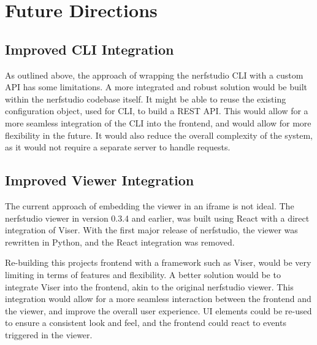 \section{Future Directions}
\label{sec:system:future}

\subsection*{Improved CLI Integration}

As outlined above, the approach of wrapping the nerfstudio CLI with a custom API has some limitations.
A more integrated and robust solution would be built within the nerfstudio codebase itself.
It might be able to reuse the existing configuration object, used for CLI, to build a REST API.
This would allow for a more seamless integration of the CLI into the frontend, and would allow for more flexibility in the future.
It would also reduce the overall complexity of the system, as it would not require a separate server to handle requests.

\subsection*{Improved Viewer Integration}

The current approach of embedding the viewer in an iframe is not ideal.
The nerfstudio viewer in version 0.3.4 and earlier, was built using React with a direct integration of Viser.
With the first major release of nerfstudio, the viewer was rewritten in Python, and the React integration was removed.

Re-building this projects frontend with a framework such as Viser, would be very limiting in terms of features and flexibility.
A better solution would be to integrate Viser into the frontend, akin to the original nerfstudio viewer.
This integration would allow for a more seamless interaction between the frontend and the viewer, and improve the overall user experience.
UI elements could be re-used to ensure a consistent look and feel, and the frontend could react to events triggered in the viewer.
